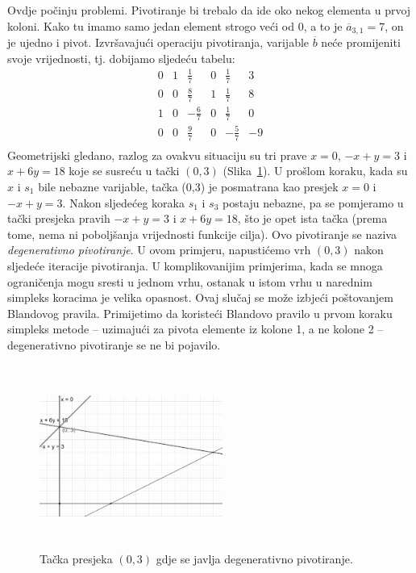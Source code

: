 \documentclass[a4paper, utf8, 11pt, colorlinks]{book}
\theoremstyle{definition}
\begin{document}
Ovdje počinju problemi. Pivotiranje bi trebalo da ide oko nekog elementa u prvoj koloni. Kako tu imamo samo jedan element strogo veći od 0, a to je $\overline{a}_{3,1}=7$, on je ujedno i pivot. Izvršavajući operaciju pivotiranja, varijable $\overline{b}$ neće promijeniti svoje vrijednosti, tj. dobijamo sljedeću tabelu:
$$\begin{array}{ccccc|c}
     0 & 1 & \frac{1}{7}  & 0 & \frac{1}{7} & 3 \\
     0 & 0 & \frac{8}{7}  & 1 & \frac{1}{7} & 8 \\
     1 & 0 & -\frac{6}{7} & 0 & \frac{1}{7} & 0 \\ \hline
     0 & 0 & \frac{9}{7}  & 0 & -\frac{5}{7} & -9 \\
\end{array}$$
Geometrijski gledano, razlog za ovakvu situaciju su tri prave $x=0$, $-x+y=3$ i $x+6y=18$ koje se susreću u tački $(0,3)$ (Slika~\ref{fig:deg-sol}). U prošlom koraku, kada su $x$ i $s_1$ bile nebazne varijable, tačka (0,3) je posmatrana kao presjek $x=0$ i $-x +y =3$. Nakon sljedećeg koraka $s_1$ i $s_3$ postaju nebazne, pa se pomjeramo u tački presjeka pravih 
$-x+y=3$ i $x+6y=18$, što je opet ista tačka (prema tome, nema ni poboljšanja vrijednosti funkcije cilja). 
 Ovo pivotiranje se naziva \emph{degenerativno pivotiranje}. U ovom primjeru, napustićemo vrh $(0,3)$ nakon sljedeće iteracije  pivotiranja. U komplikovanijim primjerima, kada se mnoga ograničenja mogu sresti u jednom vrhu, ostanak u istom vrhu u narednim simpleks koracima je velika opasnost. Ovaj slučaj se može izbjeći poštovanjem 
 Blandovog pravila. Primijetimo da koristeći Blandovo pravilo u prvom koraku simpleks metode -- uzimajući za pivota elemente iz kolone 1, a ne kolone 2 --  degenerativno pivotiranje se ne bi pojavilo.  


\begin{figure}[!ht]
	\centering
	\includegraphics[width=170pt,height=170pt]{deg-sol.eps}
	\caption{Tačka presjeka $(0,3)$ gdje se javlja degenerativno pivotiranje.}
	\label{fig:deg-sol}
\end{figure}
\end{document}
